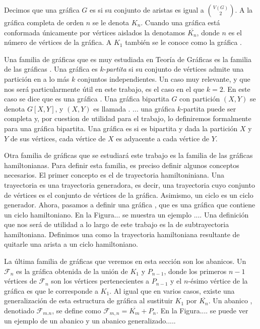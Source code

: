    Decimos que una gr\'afica $G$ es  si su
    conjunto de aristas es igual a $\binom{V(G)}{2}$. A la gr\'afica completa de
    orden $n$ se le denota $K_n$. Cuando una gr\'afica est\'a conformada
    \'unicamente por v\'ertices aislados la denotamos $\overline{K_n}$, donde
    $n$ es el n\'umero de v\'ertices de la gr\'afica. A $K_1$ tambi\'en se le
    conoce como la gr\'afica  .

    Una familia de gr\'aficas que es muy estudiada en Teor\'ia de Gr\'aficas es
    la familia de las gr\'aficas . Una
    gr\'afica es $k$-\textit{partita} si su conjunto de v\'ertices admite una
    partici\'on en a lo m\'as $k$ conjuntos independientes. Un caso muy
    relevante, y que nos ser\'a particularmente \'util en este trabajo, es el
    caso en el que $k=2$. En este caso se dice que es una gr\'afica
    . Una gr\'afica bipartita $G$ con
    partici\'on $(X,Y)$ se denota $G[X,Y]$, y $(X,Y)$ es llamada
    .
    ... una gr\'afica $k$-partita puede ser completa y, por cuestion de utilidad
    para el trabajo, lo definiremos formalmente para una gr\'afica bipartita.
    Una gr\'afica es  si es bipartita y
    dada la partici\'on $X$ y $Y$ de sus v\'ertices, cada v\'ertice de $X$ es
    adyacente a cada v\'ertice de $Y$. 

    Otra  familia de gr\'aficas que se estudiar\'a este trabajo es la familia de
    las gr\'aficas hamiltonianas. Para definir esta familia, es preciso definir
    algunos conceptos necesarios. El primer concepto es el de trayectoria
    hamiltoniniana. Una trayectoria  es una
    trayectoria generadora, es decir, una trayectoria cuyo conjunto de
    v\'ertices es el conjunto de v\'ertices de la gr\'afica. Asimismo, un ciclo
     es un ciclo generador. Ahora, pasamos a
    definir una gr\'afica , que es una
    gr\'afica que contiene un ciclo hamiltoniano. En la Figura... se muestra un
    ejemplo .... Una definici\'on que nos ser\'a de utilidad a lo largo de este
    trabajo es la de subtrayectoria hamiltoniana. Definimos una
     como la trayectoria hamiltoniana
    resultante de quitarle una arista a un ciclo hamiltoniano. 

    La \'ultima familia de gr\'aficas que veremos en esta secci\'on son los
    abanicos. Un  $\mathcal{F}_n$ es la gr\'afica obtenida de la
    uni\'on de $K_1$ y $P_{n-1}$, donde los primeros $n-1$ v\'ertices de
    $\mathcal{F}_n$ son los v\'ertices pertenecientes a $P_{n-1}$ y el
    $n$-\'esimo v\'ertice de la gr\'afica es que le corresponde a $K_1$. Al
    igual que en varios casos, existe una generalizaci\'on de esta estructura de
    gr\'afica al sustituir $K_1$ por $\overline{K_n}$. Un abanico
    , denotiado $\mathcal{F}_{m.n}$, se define
    como $\mathcal{F}_{m,n}=\overline{K_m}+P_n$. En la Figura.... se puede ver
    un ejemplo de un abanico y un abanico generalizado.....



